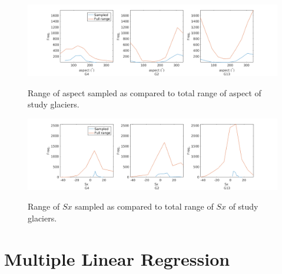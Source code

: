 \documentclass[12pt]{article}
\begin{document}
\begin{landscape}
\begin{figure}
	\centering
	\includegraphics[height = 0.4\textwidth]{SampledRangeTopo_aspect.png}\\
	\caption{Range of aspect sampled as compared to total range of aspect of study glaciers.}
	\label{sampledRange:aspect}
\end{figure}

\begin{figure}
	\centering
	\includegraphics[height = 0.4\textwidth]{SampledRangeTopo_Sx.png}\\
	\caption{Range of $Sx$ sampled as compared to total range of $Sx$ of study glaciers.}
	\label{sampledRange:Sx}
\end{figure}

\end{landscape}


\section{Multiple Linear Regression}
\end{document}
